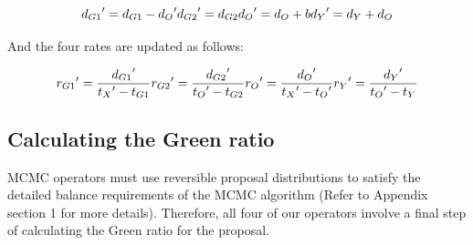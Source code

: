 \documentclass{bmcart}
\begin{document}
\begin{equation}\label{example2.1}
{d_{G1}}' = {d_{G1}} - {d_O}'  \\
{d_{G2}}' = {d_{G2}}  \\
{d_O}' = {d_O} + b  \\
{d_Y}' = {d_Y} + {d_O}
\end{equation}

And the four rates are updated as follows:

\begin{equation}\label{example2.2}
{r_{G1}}' = \frac{{{d_{G1}}'}}{{{t_X}' - {t_{G1}}}} \\
{r_{G2}}' = \frac{{{d_{G2}}'}}{{{t_O}' - {t_{G2}}}} \\
{r_O}' = \frac{{{d_O}'}}{{{t_X}' - {t_O}'}} \\
{r_Y}' = \frac{{{d_Y}'}}{{{t_O}' - {t_Y}}}
\end{equation}

\subsection*{Calculating the Green ratio}
MCMC operators must use reversible proposal distributions to satisfy the detailed balance requirements of the MCMC algorithm (Refer to  Appendix section 1 for more details). Therefore, all four of our operators involve a final step of calculating the Green ratio for the proposal.
\end{document}
